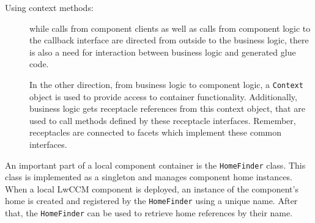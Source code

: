 \begin{description}
\item [Using context methods:]
while calls from component clients as well as calls from component logic to 
the callback interface 
are directed from outside to the business logic, there is also
a need for interaction between business logic and generated glue code.

In the other direction, from business logic to component logic, a {\tt Context}
object is used to provide access to container functionality.
Additionally, business logic gets receptacle references from this context 
object, that are used to call methods defined by these receptacle interfaces.
Remember, receptacles are connected to facets which implement these common
interfaces.
\end{description}

\noindent
An important part of a local component container is the {\tt HomeFinder} class. 
This class is implemented as a singleton
\cite{Gamma95} and manages component home instances.
When a local LwCCM component is deployed, an instance of the component's home
is created and registered by the {\tt HomeFinder} using a unique name. 
After that, the {\tt HomeFinder} can be used to retrieve home references by 
their name.
